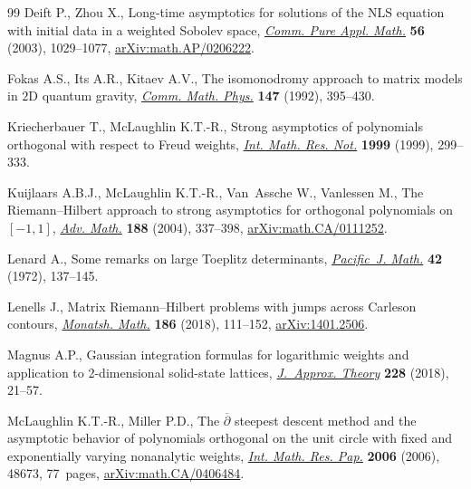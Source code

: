 \documentclass[11pt]{article}
\numberwithin{equation}{section}
\numberwithin{equation}{section}
\begin{document}
\begin{thebibliography}{99}
Deift P., Zhou X., Long-time asymptotics for solutions of the {NLS} equation
 with initial data in a weighted {S}obolev space, \href{https://doi.org/10.1002/cpa.3034}{\textit{Comm. Pure Appl.
 Math.}} \textbf{56} (2003), 1029--1077, \href{https://arxiv.org/abs/math.AP/0206222}{arXiv:math.AP/0206222}.

Fokas A.S., Its A.R., Kitaev A.V., The isomonodromy approach to matrix models
 in {$2$}{D} quantum gravity, \href{https://doi.org/10.1007/BF02096594}{\textit{Comm. Math. Phys.}} \textbf{147} (1992),
 395--430.

Kriecherbauer T., McLaughlin K.T.-R., Strong asymptotics of polynomials
 orthogonal with respect to {F}reud weights, \href{https://doi.org/10.1155/S1073792899000161}{\textit{Int. Math. Res. Not.}}
 \textbf{1999} (1999), 299--333.

Kuijlaars A.B.J., McLaughlin K.T.-R., Van~Assche W., Vanlessen M., The
 {R}iemann--{H}ilbert approach to strong asymptotics for orthogonal
 polynomials on {$[-1,1]$}, \href{https://doi.org/10.1016/j.aim.2003.08.015}{\textit{Adv. Math.}} \textbf{188} (2004), 337--398,
 \href{https://arxiv.org/abs/math.CA/0111252}{arXiv:math.CA/0111252}.

Lenard A., Some remarks on large {T}oeplitz determinants, \href{https://doi.org/10.2140/pjm.1972.42.137}{\textit{Pacific~J.
 Math.}} \textbf{42} (1972), 137--145.

Lenells J., Matrix {R}iemann--{H}ilbert problems with jumps across {C}arleson
 contours, \href{https://doi.org/10.1007/s00605-017-1019-0}{\textit{Monatsh. Math.}} \textbf{186} (2018), 111--152,
 \href{https://arxiv.org/abs/1401.2506}{arXiv:1401.2506}.

Magnus A.P., Gaussian integration formulas for logarithmic weights and
 application to 2-dimensional solid-state lattices, \href{https://doi.org/10.1016/j.jat.2018.02.001}{\textit{J.~Approx. Theory}}
 \textbf{228} (2018), 21--57.

McLaughlin K.T.-R., Miller P.D., The {$\overline{\partial}$} steepest descent
 method and the asymptotic behavior of polynomials orthogonal on the unit
 circle with fixed and exponentially varying nonanalytic weights, \href{https://doi.org/10.1155/IMRP/2006/48673}{\textit{Int.
 Math. Res. Pap.}} \textbf{2006} (2006), 48673, 77~pages,
 \href{https://arxiv.org/abs/math.CA/0406484}{arXiv:math.CA/0406484}.


\end{thebibliography}
\end{document}

